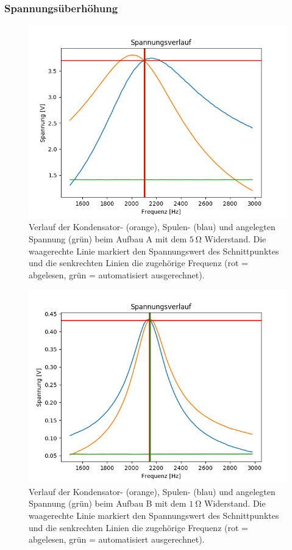 \documentclass[12pt,a4paper]{article}
\begin{document}
\subsubsection{Spannungsüberhöhung}
\begin{figure}
	\centering
	\includegraphics[scale=0.8]{Bilder/Serie_Spannungsueberhoehung_A_5.png}
	\caption{Verlauf der Kondensator- (orange), Spulen- (blau) und angelegten Spannung (grün) beim Aufbau A mit dem $\SI{5}{\ohm}$ Widerstand. Die waagerechte Linie markiert den Spannungswert des Schnittpunktes und die senkrechten Linien die zugehörige Frequenz (rot = abgelesen, grün = automatisiert ausgerechnet).}
	\label{fig:Serie_Spannungsueberhoehung_A_5}
\end{figure}


\begin{figure}
	\centering
	\includegraphics[scale=0.8]{Bilder/Serie_Spannungsueberhoehung_B_1.png}
	\caption{Verlauf der Kondensator- (orange), Spulen- (blau) und angelegten Spannung (grün) beim Aufbau B mit dem $\SI{1}{\ohm}$ Widerstand. Die waagerechte Linie markiert den Spannungswert des Schnittpunktes und die senkrechten Linien die zugehörige Frequenz (rot = abgelesen, grün = automatisiert ausgerechnet).}
	\label{fig:Serie_Spannungsueberhoehung_B_1}
\end{figure}
\end{document}
